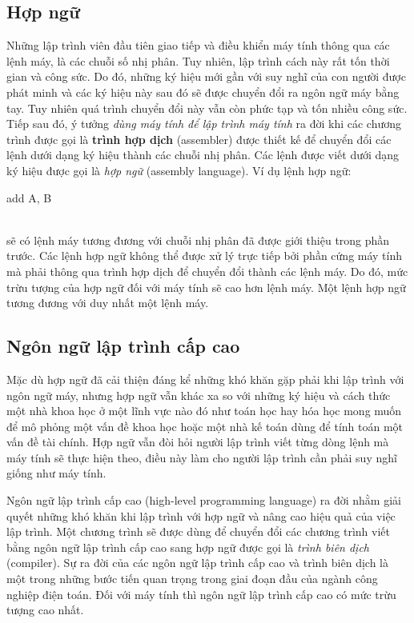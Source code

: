 \subsection{Hợp ngữ}
Những lập trình viên đầu tiên giao tiếp và điều khiển máy tính thông qua các lệnh máy, là các chuỗi số nhị phân. Tuy nhiên, lập trình cách này rất tốn thời gian và công sức. Do đó, những ký hiệu mới gần với suy nghĩ của con người được phát minh và các ký hiệu này sau đó sẽ được chuyển đổi ra ngôn ngữ máy bằng tay. Tuy nhiên quá trình chuyển đổi này vẫn còn phức tạp và tốn nhiều công sức. Tiếp sau đó, ý tưởng \emph{dùng máy tính để lập trình máy tính} ra đời khi các chương trình được gọi là \textbf{trình hợp dịch} (assembler) được thiết kế để chuyển đổi các lệnh dưới dạng ký hiệu thành các chuỗi nhị phân. Các lệnh được viết dưới dạng ký hiệu được gọi là \emph{hợp ngữ} (assembly language). Ví dụ lệnh hợp ngữ:\\
\begin{minipage}[l]{8cm}
\leftskip=0.5cm
{\ttfamily add A, B}
\end{minipage}\\
sẽ có lệnh máy tương đương với chuỗi nhị phân đã được giới thiệu trong phần trước. Các lệnh hợp ngữ không thể được xử lý trực tiếp bởi phần cứng máy tính mà phải thông qua trình hợp dịch để chuyển đổi thành các lệnh máy. Do đó, mức trừu tượng của hợp ngữ đối với máy tính sẽ cao hơn lệnh máy. Một lệnh hợp ngữ tương đương với duy nhất một lệnh máy.

\subsection{Ngôn ngữ lập trình cấp cao}
Mặc dù hợp ngữ đã cải thiện đáng kể những khó khăn gặp phải khi lập trình với ngôn ngữ máy, nhưng hợp ngữ vẫn khác xa so với những ký hiệu và cách thức một nhà khoa học ở một lĩnh vực nào đó như toán học hay hóa học mong muốn để mô phỏng một vấn đề khoa học hoặc một nhà kế toán dùng để tính toán một vấn đề tài chính. Hợp ngữ vẫn đòi hỏi người lập trình viết từng dòng lệnh mà máy tính sẽ thực hiện theo, điều này làm cho người lập trình cần phải suy nghĩ giống như máy tính.

Ngôn ngữ lập trình cấp cao (high-level programming language) ra đời nhằm giải quyết những khó khăn khi lập trình với hợp ngữ và nâng cao hiệu quả của việc lập trình. Một chương trình sẽ được dùng để chuyển đổi các chương trình viết bằng ngôn ngữ lập trình cấp cao sang hợp ngữ được gọi là \emph{trình biên dịch} (compiler). Sự ra đời của các ngôn ngữ lập trình cấp cao và trình biên dịch là một trong những bước tiến quan trọng trong giai đoạn đầu của ngành công nghiệp điện toán. Đối với máy tính thì ngôn ngữ lập trình cấp cao có mức trừu tượng cao nhất.

